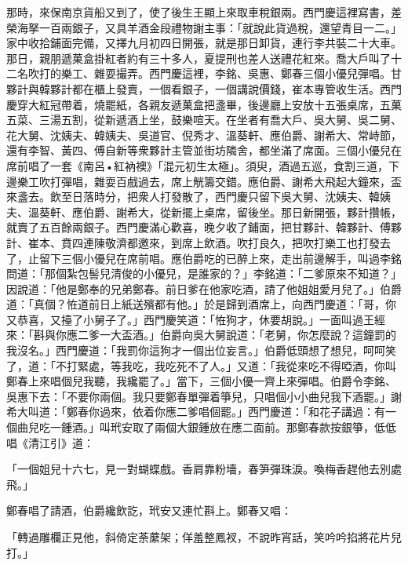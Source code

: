 那時，來保南京貨船又到了，使了後生王顯上來取車稅銀兩。西門慶這裡寫書，差榮海拏一百兩銀子，又具羊酒金段禮物謝主事：「就說此貨過稅，還望青目一二。」家中收拾鋪面完備，又擇九月初四日開張，就是那日卸貨，連行李共裝二十大車。那日，親朋遞菓盒掛紅者約有三十多人，夏提刑也差人送禮花紅來。喬大戶叫了十二名吹打的樂工、雜耍撮弄。西門慶這裡，李銘、吳惠、鄭春三個小優兒彈唱。甘夥計與韓夥計都在櫃上發賣，一個看銀子，一個講說價錢，崔本專管收生活。西門慶穿大紅冠帶着，燒罷紙，{}各親友遞菓盒把盞畢，後邊廳上安放十五張桌席，五菓五菜、三湯五割，從新遞酒上坐，鼓樂喧天。在坐者有喬大戶、吳大舅、吳二舅、花大舅、沈姨夫、韓姨夫、吳道官、倪秀才、溫葵軒、應伯爵、謝希大、常峙節，還有李智、黃四、傅自新等衆夥計主管並街坊隣舍，都坐滿了席面。三個小優兒在席前唱了一套《南呂•紅衲襖》「混元初生太極」。{}須臾，酒過五巡，食割三道，下邊樂工吹打彈唱，雜耍百戲過去，席上觥籌交錯。應伯爵、謝希大飛起大鐘來，盃來盞去。飲至日落時分，把衆人打發散了，西門慶只留下吳大舅、沈姨夫、韓姨夫、溫葵軒、應伯爵、謝希大，從新擺上桌席，留後坐。那日新開張，夥計攢帳，就賣了五百餘兩銀子。西門慶滿心歡喜，晚夕收了鋪面，把甘夥計、韓夥計、傅夥計、崔本、賁四連陳敬濟都邀來，到席上飲酒。吹打良久，把吹打樂工也打發去了，止留下三個小優兒在席前唱。應伯爵吃的已醉上來，走出前邊解手，叫過李銘問道：「那個紮包髻兒清俊的小優兒，是誰家的？」李銘道：「二爹原來不知道？」因說道：「他是鄭奉的兄弟鄭春。前日爹在他家吃酒，請了他姐姐愛月兒了。」伯爵道：「真個？恠道前日上紙送殯都有他。」於是歸到酒席上，向西門慶道：「哥，你又恭喜，又擡了小舅子了。」西門慶笑道：「恠狗才，休要胡說。」一面叫過王經來：「斟與你應二爹一大盃酒。」伯爵向吳大舅說道：「老舅，你怎麼說？這鐘罰的我沒名。」西門慶道：「我罰你這狗才一個出位妄言。」伯爵低頭想了想兒，呵呵笑了，道：「不打緊處，等我吃，我吃死不了人。」又道：「我從來吃不得啞酒，你叫鄭春上來唱個兒我聽，我纔罷了。」當下，三個小優一齊上來彈唱。伯爵令李銘、吳惠下去：「不要你兩個。我只要鄭春單彈着箏兒，只唱個小小曲兒我下酒罷。」{}謝希大叫道：「鄭春你過來，依着你應二爹唱個罷。」西門慶道：「和花子講過：有一個曲兒吃一鍾酒。」叫玳安取了兩個大銀鍾放在應二面前。那鄭春款按銀箏，低低唱《清江引》道：{}

\begin{myquote}
「一個姐兒十六七，見一對蝴蝶戲。香肩靠粉墻，春笋彈珠淚。喚梅香趕他去別處飛。」
\end{myquote}

鄭春唱了請酒，伯爵纔飲訖，玳安又連忙斟上。鄭春又唱：

\begin{myquote}
「轉過雕欄正見他，斜倚定荼䕷架；佯羞整鳳衩，不說昨宵話，笑吟吟掐將花片兒打。」{}
\end{myquote}

